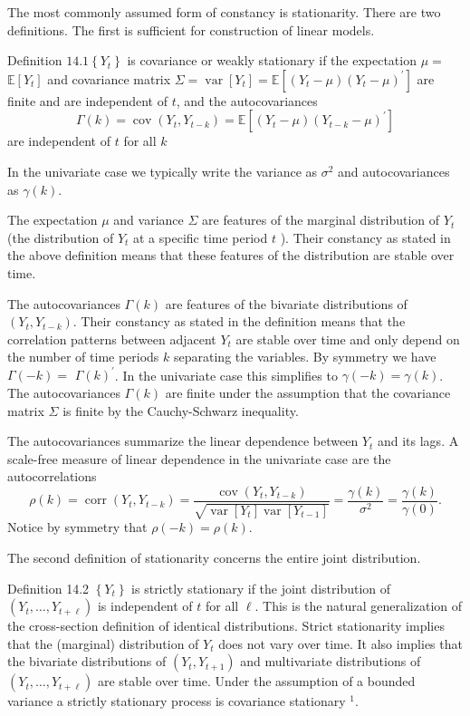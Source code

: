 \documentclass[10pt]{article}
\begin{document}
The most commonly assumed form of constancy is stationarity. There are two definitions. The first is sufficient for construction of linear models.

Definition $14.1\left\{Y_{t}\right\}$ is covariance or weakly stationary if the expectation $\mu=$ $\mathbb{E}\left[Y_{t}\right]$ and covariance matrix $\Sigma=\operatorname{var}\left[Y_{t}\right]=\mathbb{E}\left[\left(Y_{t}-\mu\right)\left(Y_{t}-\mu\right)^{\prime}\right]$ are finite and are independent of $t$, and the autocovariances
$$
\Gamma(k)=\operatorname{cov}\left(Y_{t}, Y_{t-k}\right)=\mathbb{E}\left[\left(Y_{t}-\mu\right)\left(Y_{t-k}-\mu\right)^{\prime}\right]
$$
are independent of $t$ for all $k$

In the univariate case we typically write the variance as $\sigma^{2}$ and autocovariances as $\gamma(k)$.

The expectation $\mu$ and variance $\Sigma$ are features of the marginal distribution of $Y_{t}$ (the distribution of $Y_{t}$ at a specific time period $t$ ). Their constancy as stated in the above definition means that these features of the distribution are stable over time.

The autocovariances $\Gamma(k)$ are features of the bivariate distributions of $\left(Y_{t}, Y_{t-k}\right)$. Their constancy as stated in the definition means that the correlation patterns between adjacent $Y_{t}$ are stable over time and only depend on the number of time periods $k$ separating the variables. By symmetry we have $\Gamma(-k)=$ $\Gamma(k)^{\prime}$. In the univariate case this simplifies to $\gamma(-k)=\gamma(k)$. The autocovariances $\Gamma(k)$ are finite under the assumption that the covariance matrix $\Sigma$ is finite by the Cauchy-Schwarz inequality.

The autocovariances summarize the linear dependence between $Y_{t}$ and its lags. A scale-free measure of linear dependence in the univariate case are the autocorrelations
$$
\rho(k)=\operatorname{corr}\left(Y_{t}, Y_{t-k}\right)=\frac{\operatorname{cov}\left(Y_{t}, Y_{t-k}\right)}{\sqrt{\operatorname{var}\left[Y_{t}\right] \operatorname{var}\left[Y_{t-1}\right]}}=\frac{\gamma(k)}{\sigma^{2}}=\frac{\gamma(k)}{\gamma(0)} .
$$
Notice by symmetry that $\rho(-k)=\rho(k)$.

The second definition of stationarity concerns the entire joint distribution.

Definition 14.2 $\left\{Y_{t}\right\}$ is strictly stationary if the joint distribution of $\left(Y_{t}, \ldots, Y_{t+\ell}\right)$ is independent of $t$ for all $\ell$. This is the natural generalization of the cross-section definition of identical distributions. Strict stationarity implies that the (marginal) distribution of $Y_{t}$ does not vary over time. It also implies that the bivariate distributions of $\left(Y_{t}, Y_{t+1}\right)$ and multivariate distributions of $\left(Y_{t}, \ldots, Y_{t+\ell}\right)$ are stable over time. Under the assumption of a bounded variance a strictly stationary process is covariance stationary ${ }^{1}$.
\end{document}
